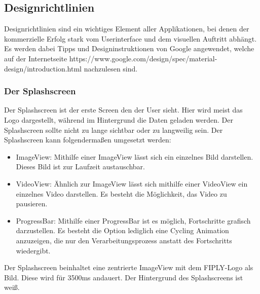 \documentclass[FIPLY_base.tex]{subfiles}
\begin{document}
	
\subsection{Designrichtlinien}
Designrichtlinien sind ein wichtiges Element aller Applikationen, bei denen der kommerzielle Erfolg stark vom Userinterface und dem visuellen Auftritt abhängt. Es werden dabei Tipps und Designinstruktionen von Google angewendet, welche auf der Internetseite https://www.google.com/design/spec/material-design/introduction.html nachzulesen sind. 

\subsubsection{Der Splashscreen}
Der Splashscreen ist der erste Screen den der User sieht. Hier wird meist das Logo dargestellt, während im Hintergrund die Daten geladen werden.
Der Splashscreen sollte nicht zu lange sichtbar oder zu langweilig sein. Der Splashscreen kann folgendermaßen umgesetzt werden:
\begin{itemize}
	\item ImageView: Mithilfe einer ImageView lässt sich ein einzelnes Bild darstellen. Dieses Bild ist zur Laufzeit austauschbar.
	\item VideoView: Ähnlich zur ImageView lässt sich mithilfe einer VideoView ein einzelnes Video darstellen. Es besteht die Möglichkeit, das Video zu pausieren.
	\item ProgressBar: Mithilfe einer ProgressBar ist es möglich, Fortschritte grafisch darzustellen. Es besteht die Option lediglich eine Cycling Animation anzuzeigen, die nur den Verarbeitungsprozess anstatt des Fortschritts wiedergibt.
\end{itemize}
Der Splashscreen beinhaltet eine zentrierte ImageView mit dem FIPLY-Logo als Bild. Diese wird für 3500ms andauert. Der Hintergrund des Splashscreens ist weiß. 
\end{document}
